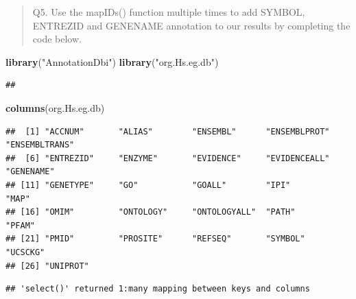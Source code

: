 \documentclass[
]{article}
\newenvironment{Shaded}{\begin{snugshade}}{\end{snugshade}}
\newcommand{\AttributeTok}[1]{\textcolor[rgb]{0.13,0.29,0.53}{#1}}
\newcommand{\FunctionTok}[1]{\textcolor[rgb]{0.13,0.29,0.53}{\textbf{#1}}}
\newcommand{\NormalTok}[1]{#1}
\newcommand{\OtherTok}[1]{\textcolor[rgb]{0.56,0.35,0.01}{#1}}
\newcommand{\SpecialCharTok}[1]{\textcolor[rgb]{0.81,0.36,0.00}{\textbf{#1}}}
\newcommand{\StringTok}[1]{\textcolor[rgb]{0.31,0.60,0.02}{#1}}
\begin{document}
\begin{quote}
Q5. Use the mapIDs() function multiple times to add SYMBOL, ENTREZID and
GENENAME annotation to our results by completing the code below.
\end{quote}

\begin{Shaded}
\begin{Highlighting}[]
\FunctionTok{library}\NormalTok{(}\StringTok{"AnnotationDbi"}\NormalTok{)}
\FunctionTok{library}\NormalTok{(}\StringTok{"org.Hs.eg.db"}\NormalTok{)}
\end{Highlighting}
\end{Shaded}

\begin{verbatim}
## 
\end{verbatim}

\begin{Shaded}
\begin{Highlighting}[]
\FunctionTok{columns}\NormalTok{(org.Hs.eg.db)}
\end{Highlighting}
\end{Shaded}

\begin{verbatim}
##  [1] "ACCNUM"       "ALIAS"        "ENSEMBL"      "ENSEMBLPROT"  "ENSEMBLTRANS"
##  [6] "ENTREZID"     "ENZYME"       "EVIDENCE"     "EVIDENCEALL"  "GENENAME"    
## [11] "GENETYPE"     "GO"           "GOALL"        "IPI"          "MAP"         
## [16] "OMIM"         "ONTOLOGY"     "ONTOLOGYALL"  "PATH"         "PFAM"        
## [21] "PMID"         "PROSITE"      "REFSEQ"       "SYMBOL"       "UCSCKG"      
## [26] "UNIPROT"
\end{verbatim}

\begin{Shaded}
\end{Shaded}

\begin{verbatim}
## 'select()' returned 1:many mapping between keys and columns
\end{verbatim}
\end{document}
